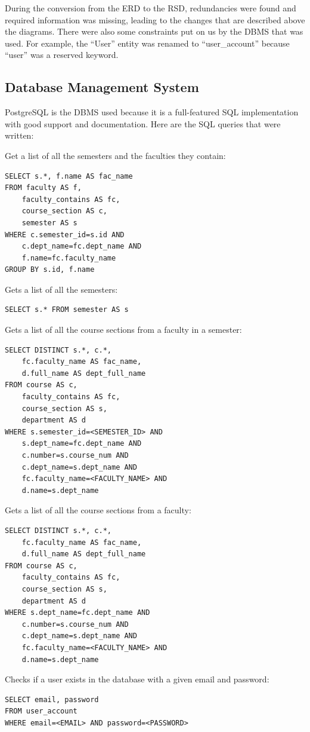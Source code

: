 \documentclass[twoside=false,a4paper,11pt]{article}
\theoremstyle{mytheor}
\begin{document}
During the conversion from the ERD to the RSD, redundancies were found and required information was missing, leading to the changes that are described above the diagrams. There were also some constraints put on us by the DBMS that was used. For example, the ``User'' entity was renamed to ``user\_account'' because ``user'' was a reserved keyword.

\subsection*{Database Management System}

PostgreSQL is the DBMS used because it is a full-featured SQL implementation with good support and documentation. Here are the SQL queries that were written:

Get a list of all the semesters and the faculties they contain:
\begin{lstlisting}
SELECT s.*, f.name AS fac_name
FROM faculty AS f,
	faculty_contains AS fc,
	course_section AS c,
	semester AS s
WHERE c.semester_id=s.id AND
	c.dept_name=fc.dept_name AND
	f.name=fc.faculty_name
GROUP BY s.id, f.name
\end{lstlisting}

Gets a list of all the semesters:
\begin{lstlisting}
SELECT s.* FROM semester AS s
\end{lstlisting}

Gets a list of all the course sections from a faculty in a semester:
\begin{lstlisting}
SELECT DISTINCT s.*, c.*,
	fc.faculty_name AS fac_name,
	d.full_name AS dept_full_name
FROM course AS c,
	faculty_contains AS fc,
	course_section AS s,
	department AS d
WHERE s.semester_id=<SEMESTER_ID> AND
	s.dept_name=fc.dept_name AND
	c.number=s.course_num AND
	c.dept_name=s.dept_name AND
	fc.faculty_name=<FACULTY_NAME> AND
	d.name=s.dept_name
\end{lstlisting}

Gets a list of all the course sections from a faculty:
\begin{lstlisting}
SELECT DISTINCT s.*, c.*,
	fc.faculty_name AS fac_name,
	d.full_name AS dept_full_name
FROM course AS c,
	faculty_contains AS fc,
	course_section AS s,
	department AS d
WHERE s.dept_name=fc.dept_name AND
	c.number=s.course_num AND
	c.dept_name=s.dept_name AND
	fc.faculty_name=<FACULTY_NAME> AND
	d.name=s.dept_name
\end{lstlisting}

Checks if a user exists in the database with a given email and password:
\begin{lstlisting}
SELECT email, password
FROM user_account
WHERE email=<EMAIL> AND password=<PASSWORD>
\end{lstlisting}
\end{document}
